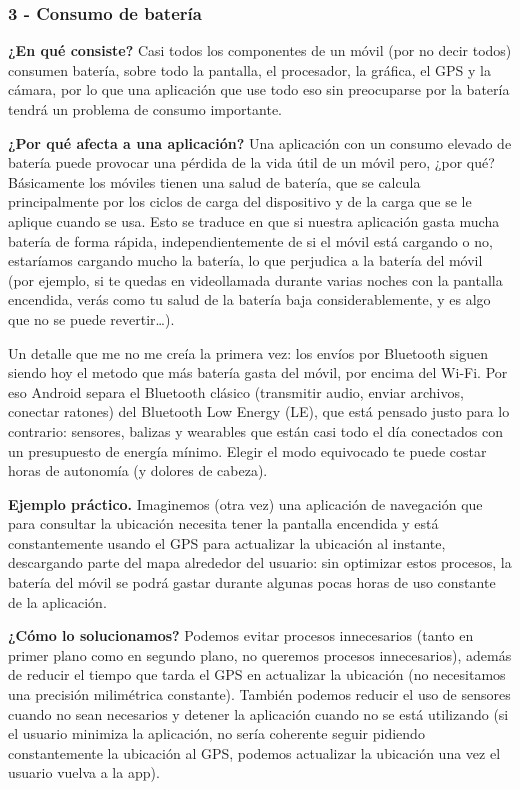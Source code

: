 \documentclass[11pt,a4paper]{article}
\newcommand{\campo}[1]{\textbf{\color{primary}#1}}
\begin{document}
	\subsubsection*{3 - Consumo de batería}
	
	\campo{¿En qué consiste?}
	Casi todos los componentes de un móvil (por no decir todos) consumen batería, sobre todo la pantalla, el procesador, la gráfica, el GPS y la cámara, por lo que una aplicación que use todo eso sin preocuparse por la batería tendrá un problema de consumo importante.
	
	\campo{¿Por qué afecta a una aplicación?}
	Una aplicación con un consumo elevado de batería puede provocar una pérdida de la vida útil de un móvil pero, ¿por qué? Básicamente los móviles tienen una salud de batería, que se calcula principalmente por los ciclos de carga del dispositivo y de la carga que se le aplique cuando se usa. Esto se traduce en que si nuestra aplicación gasta mucha batería de forma rápida, independientemente de si el móvil está cargando o no, estaríamos cargando mucho la batería, lo que perjudica a la batería del móvil (por ejemplo, si te quedas en videollamada durante varias noches con la pantalla encendida, verás como tu salud de la batería baja considerablemente, y es algo que no se puede revertir\ldots).
	
	Un detalle que me no me creía la primera vez: los envíos por Bluetooth siguen siendo hoy el metodo que más batería gasta del móvil, por encima del Wi-Fi. Por eso Android separa el Bluetooth clásico (transmitir audio, enviar archivos, conectar ratones) del Bluetooth Low Energy (LE), que está pensado justo para lo contrario: sensores, balizas y wearables que están casi todo el día conectados con un presupuesto de energía mínimo. Elegir el modo equivocado te puede costar horas de autonomía (y dolores de cabeza).
	
	\campo{Ejemplo práctico.}
	Imaginemos (otra vez) una aplicación de navegación que para consultar la ubicación necesita tener la pantalla encendida y está constantemente usando el GPS para actualizar la ubicación al instante, descargando parte del mapa alrededor del usuario: sin optimizar estos procesos, la batería del móvil se podrá gastar durante algunas pocas horas de uso constante de la aplicación.
	
	\campo{¿Cómo lo solucionamos?}
	Podemos evitar procesos innecesarios (tanto en primer plano como en segundo plano, no queremos procesos innecesarios), además de reducir el tiempo que tarda el GPS en actualizar la ubicación (no necesitamos una precisión milimétrica constante). También podemos reducir el uso de sensores cuando no sean necesarios y detener la aplicación cuando no se está utilizando (si el usuario minimiza la aplicación, no sería coherente seguir pidiendo constantemente la ubicación al GPS, podemos actualizar la ubicación una vez el usuario vuelva a la app).
	
\end{document}

